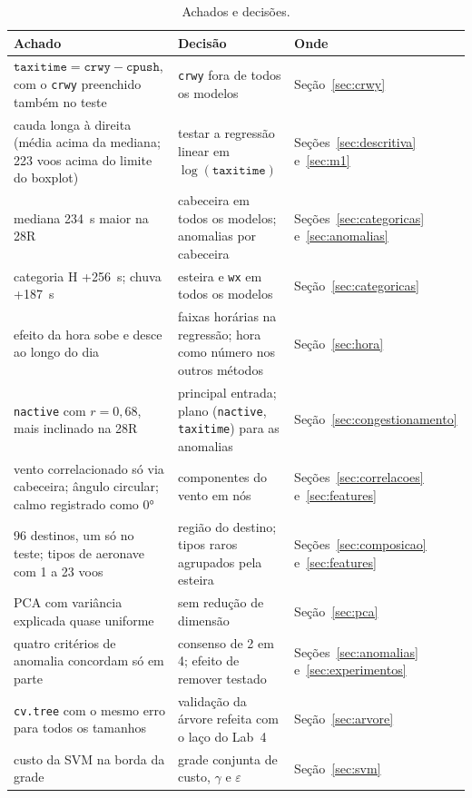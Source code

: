 \documentclass[12pt,a4paper]{article}
\begin{document}
\begin{table}[H]\centering\scriptsize
\caption{Achados e decisões.}\label{tab:achados}
\renewcommand{\arraystretch}{1.25}
\begin{tabular}{p{5.0cm}p{5.6cm}p{3.3cm}}
\toprule
Achado & Decisão & Onde\\
\midrule
$\texttt{taxitime}=\texttt{crwy}-\texttt{cpush}$, com o \texttt{crwy} preenchido também no teste & \texttt{crwy} fora de todos os modelos & Seção~\ref{sec:crwy}\\
cauda longa à direita (média acima da mediana; 223 voos acima do limite do boxplot) & testar a regressão linear em $\log(\texttt{taxitime})$ & Seções~\ref{sec:descritiva} e~\ref{sec:m1}\\
mediana 234~s maior na 28R & cabeceira em todos os modelos; anomalias por cabeceira & Seções~\ref{sec:categoricas} e~\ref{sec:anomalias}\\
categoria H +256~s; chuva +187~s & esteira e \texttt{wx} em todos os modelos & Seção~\ref{sec:categoricas}\\
efeito da hora sobe e desce ao longo do dia & faixas horárias na regressão; hora como número nos outros métodos & Seção~\ref{sec:hora}\\
\texttt{nactive} com $r=0{,}68$, mais inclinado na 28R & principal entrada; plano (\texttt{nactive}, \texttt{taxitime}) para as anomalias & Seção~\ref{sec:congestionamento}\\
vento correlacionado só via cabeceira; ângulo circular; calmo registrado como 0° & componentes do vento em nós & Seções~\ref{sec:correlacoes} e~\ref{sec:features}\\
96 destinos, um só no teste; tipos de aeronave com 1 a 23 voos & região do destino; tipos raros agrupados pela esteira & Seções~\ref{sec:composicao} e~\ref{sec:features}\\
PCA com variância explicada quase uniforme & sem redução de dimensão & Seção~\ref{sec:pca}\\
quatro critérios de anomalia concordam só em parte & consenso de 2 em 4; efeito de remover testado & Seções~\ref{sec:anomalias} e~\ref{sec:experimentos}\\
\texttt{cv.tree} com o mesmo erro para todos os tamanhos & validação da árvore refeita com o laço do Lab~4 & Seção~\ref{sec:arvore}\\
custo da SVM na borda da grade & grade conjunta de custo, $\gamma$ e $\varepsilon$ & Seção~\ref{sec:svm}\\
\bottomrule
\end{tabular}
\end{table}
\end{document}
